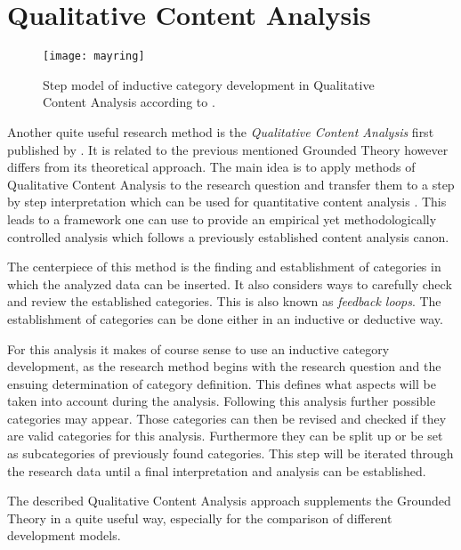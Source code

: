 
\section{Qualitative Content Analysis} %

\begin{figure}[htbp]
  \centering
  \texttt{[image: mayring]}
  \caption[Inductive Qualitative Content Analysis Process]
  {Step model of inductive category development in Qualitative Content Analysis
    according to \citeauthor{Mayring2008} \cite{Mayring2000,Mayring2008}.}
\end{figure}

Another quite useful research method is the \emph{Qualitative Content Analysis}
first published by \textcite{Mayring2008}. It is related to the previous
mentioned Grounded Theory however differs from its theoretical approach. The
main idea is to apply methods of Qualitative Content Analysis to the research
question and transfer them to a step by step interpretation which can be used
for quantitative content analysis \cite{Mayring2000}. This leads to a framework
one can use to provide an empirical yet methodologically controlled analysis
which follows a previously established content analysis canon.

The centerpiece of this method is the finding and establishment of categories
in which the analyzed data can be inserted. It also considers ways to carefully
check and review the established categories. This is also known as
\emph{feedback loops}. The establishment of categories can be done either in an
inductive or deductive way.

For this analysis it makes of course sense to use an inductive category
development, as the research method begins with the research question and the
ensuing determination of category definition. This defines what aspects will be
taken into account during the analysis. Following this analysis further
possible categories may appear. Those categories can then be revised and
checked if they are valid categories for this analysis. Furthermore they can be
split up or be set as subcategories of previously found categories. This step
will be iterated through the research data until a final interpretation and
analysis can be established.

The described Qualitative Content Analysis approach supplements the Grounded
Theory in a quite useful way, especially for the comparison of different
development models.

